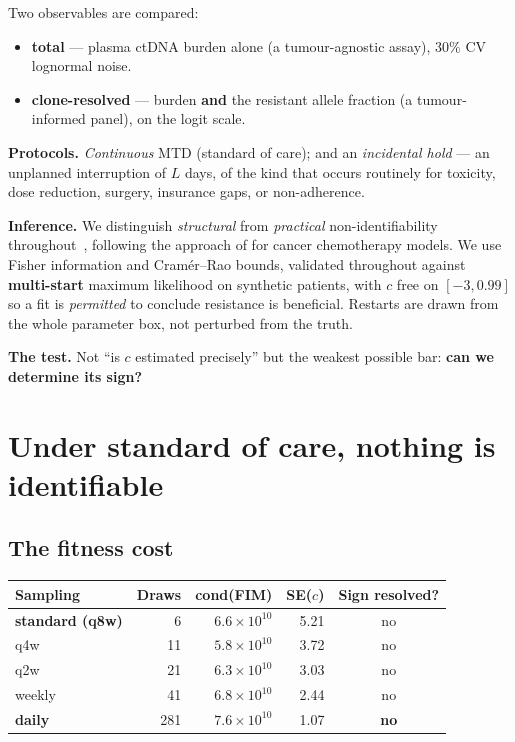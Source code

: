 \documentclass[11pt,a4paper]{article}
\begin{document}
Two observables are compared:
\begin{itemize}[leftmargin=1.4em,itemsep=0.2em]
\item \textbf{total} --- plasma ctDNA burden alone (a tumour-agnostic assay), 30\%
CV lognormal noise.
\item \textbf{clone-resolved} --- burden \textbf{and} the resistant allele fraction
(a tumour-informed panel), on the logit scale.
\end{itemize}

\textbf{Protocols.} \emph{Continuous} MTD (standard of care); and an
\emph{incidental hold} --- an unplanned interruption of $L$ days, of the kind that
occurs routinely for toxicity, dose reduction, surgery, insurance gaps, or
non-adherence.

\textbf{Inference.} We distinguish \emph{structural} from \emph{practical}
non-identifiability throughout~\citep{raue2009structural,miao2011identifiability},
following the approach of \citet{eisenberg2017confidence} for cancer chemotherapy
models. We use Fisher information and Cram\'er--Rao bounds, validated throughout
against \textbf{multi-start} maximum likelihood on synthetic patients,
with $c$ free on $[-3, 0.99]$ so a fit is \emph{permitted} to conclude resistance
is beneficial. Restarts are drawn from the whole parameter box, not perturbed from
the truth.

\textbf{The test.} Not ``is $c$ estimated precisely'' but the weakest possible bar:
\textbf{can we determine its sign?}

\section{Under standard of care, nothing is identifiable}

\subsection{The fitness cost}

\begin{center}
\begin{tabular}{lrrrc}
\toprule
\textbf{Sampling} & \textbf{Draws} & \textbf{cond(FIM)} & \textbf{SE($c$)} & \textbf{Sign resolved?}\\
\midrule
\textbf{standard (q8w)} & 6 & $6.6\times10^{10}$ & 5.21 & no\\
q4w & 11 & $5.8\times10^{10}$ & 3.72 & no\\
q2w & 21 & $6.3\times10^{10}$ & 3.03 & no\\
weekly & 41 & $6.8\times10^{10}$ & 2.44 & no\\
\textbf{daily} & 281 & $7.6\times10^{10}$ & 1.07 & \textbf{no}\\
\bottomrule
\end{tabular}
\end{center}
\end{document}
